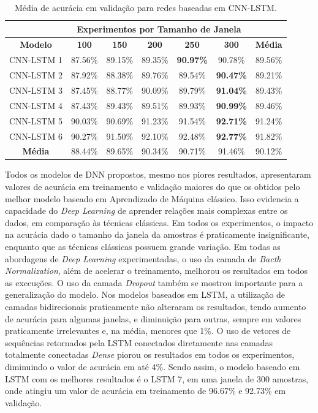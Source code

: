 \begin{table}[H]
\scriptsize
\centering
\caption{Média de acurácia em validação para redes baseadas em CNN-LSTM.} 
\label{table:cnn_lstm_results_tipo_superficie_1}
\begin{tabular}{ccccccc}
\cmidrule(lr){2-6}
& \multicolumn{5}{c}{\textbf{Experimentos por Tamanho de Janela}} & \multicolumn{1}{c}{} \\ \midrule
\textbf{Modelo} & \textbf{100} & \textbf{150} & \textbf{200} & \textbf{250} & \textbf{300} & \textbf{Média} \\ \midrule
CNN-LSTM 1 & 87.56\% & 89.15\% & 89.35\% & \textbf{90.97\%} & 90.78\% & 89.56\% \\ \midrule
CNN-LSTM 2 & 87.92\% & 88.38\% & 89.76\% & 89.54\% & \textbf{90.47\%} & 89.21\% \\ \midrule
CNN-LSTM 3 & 87.45\% & 88.77\% & 90.09\% & 89.79\% & \textbf{91.04\%} & 89.43\% \\ \midrule
CNN-LSTM 4 & 87.43\% & 89.43\% & 89.51\% & 89.93\% & \textbf{90.99\%} & 89.46\% \\ \midrule
CNN-LSTM 5 & 90.03\% & 90.69\% & 91.23\% & 91.54\% & \textbf{92.71\%} & 91.24\% \\ \midrule
CNN-LSTM 6 & 90.27\% & 91.50\% & 92.10\% & 92.48\% &\cellcolor[HTML]{34FF34}\textbf{92.77\%} & 91.82\% \\ \midrule
\textbf{Média} & 88.44\% & 89.65\% & 90.34\% & 90.71\% & 91.46\% & 90.12\% \\ \bottomrule
\end{tabular}
\end{table}

Todos os modelos de DNN propostos, mesmo nos piores resultados, apresentaram valores de acurácia em treinamento e validação maiores do que os obtidos pelo melhor modelo baseado em Aprendizado de Máquina clássico. Isso evidencia a capacidade do \textit{Deep Learning} de aprender relações mais complexas entre os dados, em comparação às técnicas clássicas. Em todos os experimentos, o impacto na acurácia dado o tamanho da janela da amostras é praticamente insignificante, enquanto que as técnicas clássicas possuem grande variação. Em todas as abordagens de \textit{Deep Learning} experimentadas, o uso da camada de \textit{Bacth Normalization}, além de acelerar o treinamento, melhorou os resultados em todos as execuções. O uso da camada \textit{Dropout} também se mostrou importante para a generalização do modelo. Nos modelos baseados em LSTM, a utilização de camadas bidirecionais praticamente não alteraram os resultados, tendo aumento de acurácia para algumas janelas, e diminuição para outras, sempre em valores praticamente irrelevantes e, na média, menores que 1\%. O uso de vetores de sequências retornados pela LSTM conectados diretamente nas camadas totalmente conectadas \textit{Dense} piorou os resultados em todos os experimentos, diminuindo o valor de acurácia em até 4\%. Sendo assim, o modelo baseado em LSTM com os melhores resultados é o LSTM 7, em uma janela de 300 amostras, onde atingiu um valor de acurácia em treinamento de 96.67\% e 92.73\% em validação.


